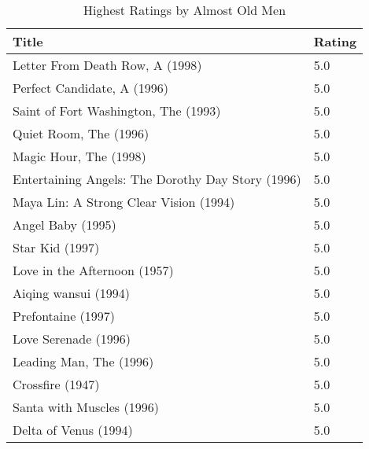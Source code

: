 \begin{table}[h!]
\centering
\begin{tabular}{| l | l |}
\hline
Title & Rating \\
\hline
Letter From Death Row, A (1998) & 5.0 \\
Perfect Candidate, A (1996) & 5.0 \\
Saint of Fort Washington, The (1993) & 5.0 \\
Quiet Room, The (1996) & 5.0 \\
Magic Hour, The (1998) & 5.0 \\
Entertaining Angels: The Dorothy Day Story (1996) & 5.0 \\
Maya Lin: A Strong Clear Vision (1994) & 5.0 \\
Angel Baby (1995) & 5.0 \\
Star Kid (1997) & 5.0 \\
Love in the Afternoon (1957) & 5.0 \\
Aiqing wansui (1994) & 5.0 \\
Prefontaine (1997) & 5.0 \\
Love Serenade (1996) & 5.0 \\
Leading Man, The (1996) & 5.0 \\
Crossfire (1947) & 5.0 \\
Santa with Muscles (1996) & 5.0 \\
Delta of Venus (1994) & 5.0 \\
\hline
\end{tabular}
\caption{Highest Ratings by Almost Old Men}
\label{tab:hrbaom}
\end{table}

